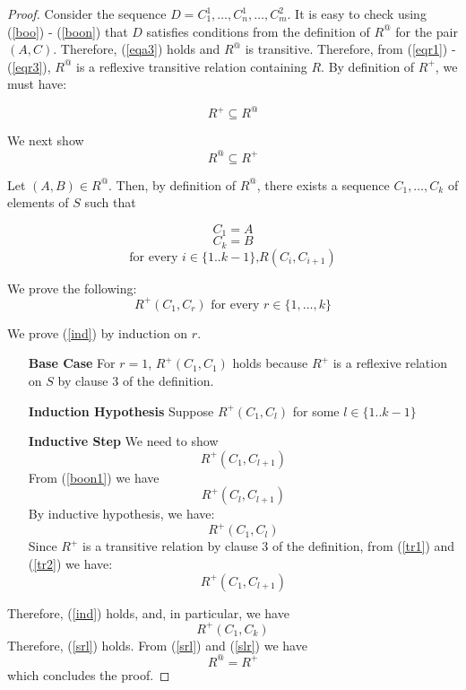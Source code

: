 \documentclass[a4paper,12pt]{article}
\newcommand\red[1]{{\color{red}#1}}
\begin{document}
\begin{proof}
\noindent
Consider the sequence $D  = C^1_1,\ldots,C^1_n,\ldots,C^2_m $.
It is easy to check using (\ref{boo}) - (\ref{boon})  that $D$ satisfies conditions from the definition of $R^@$ for the pair $(A,C)$. Therefore, (\ref{eqa3}) holds and $R^@$ is transitive. 
Therefore, from (\ref{eqr1}) - (\ref{eqr3}), $R^@$ is a reflexive transitive relation containing $R$. By definition of $R^+$, we must have:

\begin{equation}\label{slr}
R^+ \subseteq R^@
\end{equation}

\noindent
We next show
\begin{equation}\label{srl}
R^@ \subseteq R^+
\end{equation}

Let $(A,B) \in R^@$. Then, by definition of $R^@$, there exists a sequence $C_1,\ldots,C_k$ of elements of $S$ such that 
 
\begin{equation}
C_1 = A
\end{equation}
\begin{equation}
C_k = B
\end{equation}
\begin{equation}\label{boon1}
\mbox{for every $i \in \{1..k-1\}$,} R(C_i,C_{i+1})
\end{equation}

We prove the following:
\begin{equation}\label{ind}
R^+(C_1,C_r) \mbox{ for every $r\in\{1,\ldots,k\}$}
\end{equation}

We prove (\ref{ind}) by induction on $r$.
\begin{itemize}
\item[\textbf{Base Case}] For $r = 1$, $R^+(C_1,C_1)$ holds because $R^+$ is a reflexive relation on $S$ by \red{clause 3 of the definition}.
\item[\textbf{Induction Hypothesis}] Suppose $R^+(C_1,C_l)$ for some $l \in\{1..k-1\}$
\item[\textbf{Inductive Step}] We need to show 
\begin{equation}
R^+(C_1,C_{l+1})
\end{equation} 
From (\ref{boon1}) we have 
\begin{equation}\label{tr1}
R^+(C_l, C_{l+1})
\end{equation}
 By inductive hypothesis, we have:
\begin{equation}\label{tr2}
R^+(C_1,C_l)
\end{equation}
Since $R^+$ is a transitive relation by \red{clause 3 of the definition}, from (\ref{tr1}) and (\ref{tr2}) we have:
\begin{equation}
R^+(C_1,C_{l+1})
\end{equation}

\end{itemize}

Therefore, (\ref{ind}) holds, and, in particular, we have
\begin{equation}
R^+(C_1, C_k)
\end{equation}
Therefore, (\ref{srl}) holds. From (\ref{srl}) and (\ref{slr}) we have
$$R^@ = R^+$$ which concludes the proof.

\end{proof}
\end{document}
